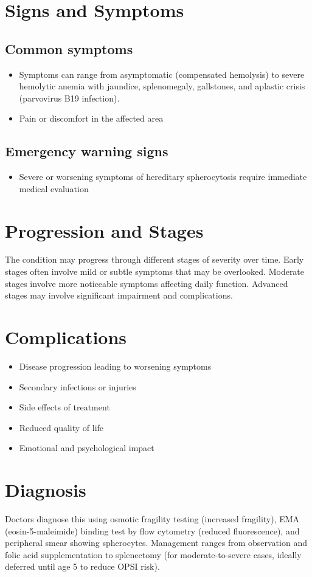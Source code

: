 \section{Signs and Symptoms}

\subsection{Common symptoms}
\begin{itemize}[noitemsep]
  \item Symptoms can range from asymptomatic (compensated hemolysis) to severe hemolytic anemia with jaundice, splenomegaly, gallstones, and aplastic crisis (parvovirus B19 infection).

  \item Pain or discomfort in the affected area
  \end{itemize}

\subsection{Emergency warning signs}
\begin{itemize}[noitemsep]
  \item Severe or worsening symptoms of hereditary spherocytosis require immediate medical evaluation
\end{itemize}
\section{Progression and Stages}
The condition may progress through different stages of severity over time. Early stages often involve mild or subtle symptoms that may be overlooked. Moderate stages involve more noticeable symptoms affecting daily function. Advanced stages may involve significant impairment and complications.
\section{Complications}
\begin{itemize}[noitemsep]
  \item Disease progression leading to worsening symptoms
  \item Secondary infections or injuries
  \item Side effects of treatment
  \item Reduced quality of life
  \item Emotional and psychological impact
\end{itemize}
\section{Diagnosis}
Doctors diagnose this using osmotic fragility testing (increased fragility), EMA (eosin-5-maleimide) binding test by flow cytometry (reduced fluorescence), and peripheral smear showing spherocytes. Management ranges from observation and folic acid supplementation to splenectomy (for moderate-to-severe cases, ideally deferred until age 5 to reduce OPSI risk).

